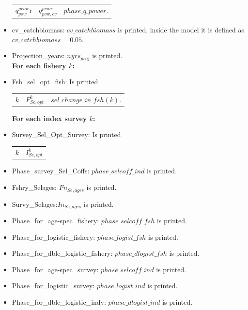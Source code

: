 \documentclass{article}
\begin{document}
\begin{itemize}
    \begin{center}
        \begin{tabular}{c c c}
            $q_{pow}^{prior}$r &  $q_{pow,cv}^{prior}$ & $phase\_q\_power$.\\
        \end{tabular}
    \end{center}
    \item cv\_catchbiomass: $cv\_catchbiomass$ is printed, inside the model it is defined as $cv\_catchbiomass = 0.05$.
    \item Projection\_years: $nyrs_{proj}$ is printed.\\

    \textbf{For each fishery $k$:}
    \item Fsh\_sel\_opt\_fish: Is printed 
    \begin{center}
        \begin{tabular}{c c c}
           $k$  &  $F^k_{Se,opt}$ & $sel\_change\_in\_fsh(k)$.\\
        \end{tabular}
    \end{center}
    \textbf{For each index survey $k$:}
    \item Survey\_Sel\_Opt\_Survey: Is printed
    \begin{center}
        \begin{tabular}{c c}
          $ k$  &  $I_{Se,opt}^k$ \\
        \end{tabular}
    \end{center}
    \item Phase\_survey\_Sel\_Coffs: $phase\_selcoff\_ind$ is printed.
    \item Fshry\_Selages:  $Fn_{Se,ages}$ is printed.
    \item Survy\_Selages:$In_{Se,ages}$ is printed.
    \item Phase\_for\_age-spec\_fishery: $phase\_selcoff\_fsh$ is printed.
    \item Phase\_for\_logistic\_fishery: $phase\_logist\_fsh$ is printed.
    \item Phase\_for\_dble\_logistic\_fishery: $phase\_dlogist\_fsh$ is printed.
    \item Phase\_for\_age-spec\_survey: $phase\_selcoff\_ind$ is printed.
    \item Phase\_for\_logistic\_survey: $phase\_logist\_ind$ is printed.
    \item Phase\_for\_dble\_logistic\_indy:  $phase\_dlogist\_ind$ is printed.\\


\end{itemize}
\end{document}
